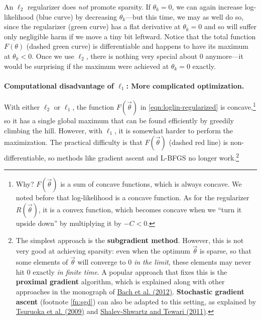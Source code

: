 \documentclass[11pt]{article}
\newcommand{\vtheta}{\vec{\theta}}
\begin{document}
An $\ell_2$ regularizer does {\em not} promote sparsity.  If $\theta_k=0$, we can again increase log-likelihood (blue curve) by decreasing $\theta_k$---but this time, we may as well do so, since the regularizer (green curve) has a flat derivative at $\theta_k=0$ and so will suffer only negligible harm if we move a tiny bit leftward.  Notice that the total function $F(\theta)$ (dashed green curve) is differentiable and happens to have its maximum at $\theta_k < 0$. Once we use $\ell_2$, there is nothing very special about 0 anymore---it would be surprising if the maximum were achieved at $\theta_k=0$ exactly.

\paragraph{Computational disadvantage of $\ell_1$: More complicated optimization.}
With either $\ell_2$ or $\ell_1$, the function $F(\vtheta)$ in \eqref{eqn:loglin-regularized} is concave,\footnote{Why?  $F(\vtheta)$ is a sum of concave functions, which is always concave.  We noted before that log-likelihood is a concave function.  As for the regularizer $R(\vtheta)$, it is a convex function, which becomes concave when we ``turn it upside down'' by multiplying it by $-C < 0$.} so it has a single global maximum that can be found efficiently by greedily climbing the hill.  However, with $\ell_1$, it is somewhat harder to perform the maximization.  The practical difficulty is that $F(\vtheta)$ (dashed red line) is non-differentiable, so methods like gradient ascent and L-BFGS no longer work.\footnote{The simplest approach is the {\bf subgradient method}.  However, this is not very good at achieving sparsity: even when the optimum $\vtheta$ is sparse, so that some elements of $\vtheta$ will converge to 0 {\em in the limit}, these elements may never hit 0 exactly {\em in finite time}.  A popular approach that fixes this is the {\bf proximal gradient} algorithm, which is explained along with other approaches in the monograph of \href{http://www.di.ens.fr/~fbach/bach_jenatton_mairal_obozinski_FOT.pdf}{Bach et al. (2012)}.  {\bf Stochastic gradient ascent} (footnote \ref{fn:sgd}) can also be adapted to this setting, as explained by \href{http://www.aclweb.org/anthology/P09-1054}{Tsuruoka et al. (2009)} and \href{http://www.jmlr.org/papers/volume12/shalev-shwartz11a/shalev-shwartz11a.pdf}{Shalev-Shwartz and Tewari (2011)}.}
\end{document}
